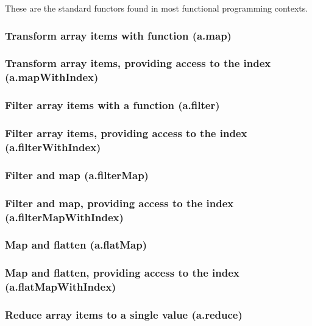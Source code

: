 \documentclass{article}
\theoremstyle{definition}
\begin{document}
These are the standard functors found in most functional programming contexts.

\subsubsection{Transform array items with function (a.map)}

\subsubsection{Transform array items, providing access to the index (a.mapWithIndex)}

\subsubsection{Filter array items with a function (a.filter)}

\subsubsection{Filter array items, providing access to the index (a.filterWithIndex)}

\subsubsection{Filter and map (a.filterMap)}

\subsubsection{Filter and map, providing access to the index (a.filterMapWithIndex)}

\subsubsection{Map and flatten (a.flatMap)}

\subsubsection{Map and flatten, providing access to the index (a.flatMapWithIndex)}

\subsubsection{Reduce array items to a single value (a.reduce)}
\end{document}
